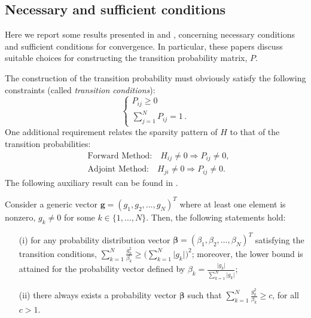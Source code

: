 \documentclass[final,leqno,onefignum,onetabnum]{siamltex1213}
\begin{document}
\subsection{Necessary and sufficient conditions}

Here we report some results presented in
\cite{Srin2010} and \cite{MASC2013},
concerning necessary conditions and sufficient conditions for convergence.
In particular, these papers discuss suitable choices for constructing the
transition probability matrix, $P$.

The construction of the transition probability must obviously satisfy the following
constraints (called \textit{transition conditions}):
\[
\begin{cases}
  P_{ij}\ge 0 \\
 \sum_{j=1}^N P_{ij}= 1 \,.
\end{cases}
\]
One additional requirement relates the sparsity pattern of $H$ to that
of the transition probabilities:
\begin{align*}
& \text{Forward Method:} \quad H_{ij}\ne 0 \Rightarrow P_{ij}\ne 0, \\ &
\text{Adjoint Method:} \quad H_{ji}\ne 0 \Rightarrow P_{ij}\ne 0.
\end{align*}
The following auxiliary result can be found in \cite{MASC2013}.

\begin{lemma}
 Consider a generic vector
$\mathbf{g}=(g_1,g_2,\ldots,g_N)^T$ where at least
one element is
nonzero, $g_k\ne0$ for some $k\in\{1,\ldots,N\}$. %
Then, the following statements hold:
\begin{enumerate}
 \item[(i)] for any probability distribution vector
$\boldsymbol{\beta}=(\beta_1,\beta_2,\ldots,
\beta_N)^T$ satisfying the
transition conditions, $\displaystyle
\sum_{k=1}^N\frac{g_k^2}{\beta_k}\ge \bigg(\sum_{k=1}^N
\lvert g_k\rvert\bigg)^2$; moreover, the lower bound is attained for
the probability vector defined by $\displaystyle \beta_k=\frac{\lvert
g_k\rvert}{\sum_{k=1}^N \lvert g_k\rvert}$;
\item[(ii)] there always exists a probability vector
$\boldsymbol{\beta}$ such that $\displaystyle
\sum_{k=1}^N\frac{g_k^2}{\beta_k}\ge c$, for all
$c>1$.
\end{enumerate}
\label{lemma1}
\end{lemma}
\end{document}
